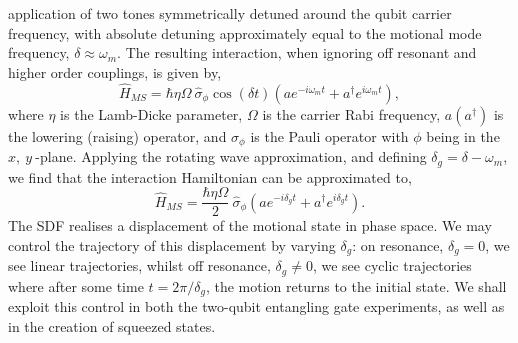 \documentclass[12pt]{report}
\begin{document}
    application of two tones symmetrically detuned around the qubit carrier
    frequency, with absolute detuning approximately equal to the motional mode
    frequency, $\delta \approx \omega_{m}$. The resulting interaction, when
    ignoring off resonant and higher order couplings, is given by,
    \begin{equation}
        \hat{H}_{MS} = \hbar \eta\Omega~\hat{\sigma}_\phi\cos(\delta t) \left( a e^{-i\omega_{m} t} + a^\dagger e^{i\omega_{m} t} \right),
    \end{equation}
    where $\eta$ is the Lamb-Dicke parameter, $\Omega$ is the carrier Rabi
    frequency, $a(a^\dagger)$ is the lowering (raising) operator, and
    $\sigma_\phi$ is the Pauli operator with $\phi$ being in the $x,~y~$-plane.
    Applying the rotating wave approximation, and defining $\delta_g = \delta -
    \omega_{m}$, we find that the interaction Hamiltonian can be approximated
    to,
    \begin{equation}
        \hat{H}_{MS} = \frac{\hbar \eta\Omega}{2}~\hat{\sigma}_\phi \left( a e^{-i\delta_g t} + a^\dagger e^{i\delta_g t} \right).
    \end{equation}
    The SDF realises a displacement of the motional state in phase space. We may
    control the trajectory of this displacement by varying $\delta_g$: on
    resonance, $\delta_g = 0$, we see linear trajectories, whilst off resonance,
    $\delta_g \neq 0$, we see cyclic trajectories where after some time $t =
    2\pi/\delta_g$, the motion returns to the initial state. We shall exploit
    this control in both the two-qubit entangling gate experiments, as well as
    in the creation of squeezed states.\\
\end{document}
